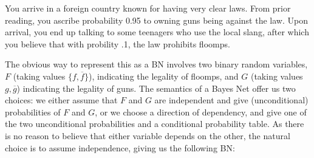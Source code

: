\documentclass{article}
\numberwithin{equation}{section}
\begin{document}
\begin{example}
		\label{ex:guns-and-floomps}
You arrive in a foreign country known for having very clear laws. From
prior reading, you ascribe probability 0.95 to owning guns being
against the law. Upon arrival, you end up talking to some teenagers
who use the local slang, after which you believe that with probility
.1, the law prohibits floomps.  
		
		The obvious way to represent this as a BN involves two
                binary random variables, $F$ (taking values $\{f,
                \overline f\}$), indicating the legality of floomps,
                and $G$ (taking values $g, \overline g$) indicating
                the legality of guns. The semantics of a Bayes Net
                offer us two choices: we either assume that $F$ and
                $G$ are independent and give (unconditional)
                probabilities of $F$ and $G$, or we choose a direction
                of dependency, 
   and give one of the two unconditional probabilities and a conditional probability table. As there is no reason to believe that either variable depends on the other, the natural choice is to assume independence, giving us the following BN:
		
		
		\begin{center}
		\end{center}
		

\end{example}
\end{document}
